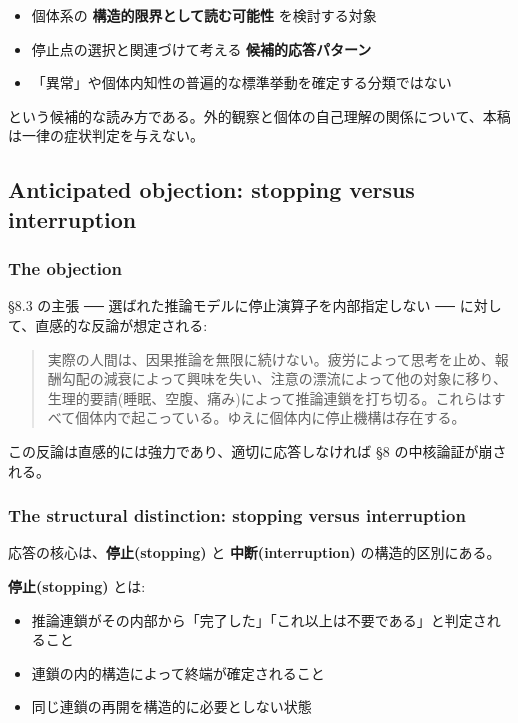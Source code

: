 \begin{itemize}
\item 個体系の \textbf{構造的限界として読む可能性} を検討する対象
\item 停止点の選択と関連づけて考える \textbf{候補的応答パターン}
\item 「異常」や個体内知性の普遍的な標準挙動を確定する分類ではない
\end{itemize}

という候補的な読み方である。外的観察と個体の自己理解の関係について、本稿は一律の症状判定を与えない。

\subsection{Anticipated objection: stopping versus interruption}


\subsubsection{The objection}


\S{}8.3 の主張 ── 選ばれた推論モデルに停止演算子を内部指定しない ── に対して、直感的な反論が想定される:

\begin{quote}
実際の人間は、因果推論を無限に続けない。疲労によって思考を止め、報酬勾配の減衰によって興味を失い、注意の漂流によって他の対象に移り、生理的要請(睡眠、空腹、痛み)によって推論連鎖を打ち切る。これらはすべて個体内で起こっている。ゆえに個体内に停止機構は存在する。
\end{quote}

この反論は直感的には強力であり、適切に応答しなければ \S{}8 の中核論証が崩される。

\subsubsection{The structural distinction: stopping versus interruption}


応答の核心は、\textbf{停止(stopping)} と \textbf{中断(interruption)} の構造的区別にある。

\textbf{停止(stopping)} とは:
\begin{itemize}
\item 推論連鎖がその内部から「完了した」「これ以上は不要である」と判定されること
\item 連鎖の内的構造によって終端が確定されること
\item 同じ連鎖の再開を構造的に必要としない状態
\end{itemize}

